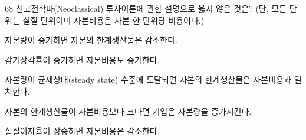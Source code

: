 \begin{question}{68}
신고전학파(Neoclassical) 투자이론에 관한 설명으로 옳지 않은 것은? (단, 모든 단위는 실질 단위이며 자본비용은 자본 한 단위당 비용이다.)
\begin{choices}
  \item 자본량이 증가하면 자본의 한계생산물은 감소한다.
  \item 감가상각률이 증가하면 자본비용도 증가한다.
  \item 자본량이 균제상태(steady state) 수준에 도달되면 자본의 한계생산물은 자본비용과 일치한다.
  \item 자본의 한계생산물이 자본비용보다 크다면 기업은 자본량을 증가시킨다.
  \item 실질이자율이 상승하면 자본비용은 감소한다.
\end{choices}
\end{question}
